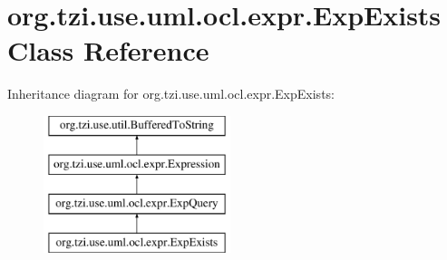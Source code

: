 \hypertarget{classorg_1_1tzi_1_1use_1_1uml_1_1ocl_1_1expr_1_1_exp_exists}{\section{org.\-tzi.\-use.\-uml.\-ocl.\-expr.\-Exp\-Exists Class Reference}
\label{classorg_1_1tzi_1_1use_1_1uml_1_1ocl_1_1expr_1_1_exp_exists}
}
Inheritance diagram for org.\-tzi.\-use.\-uml.\-ocl.\-expr.\-Exp\-Exists\-:\begin{figure}[H]
\begin{center}
\leavevmode
\includegraphics[height=4.000000cm]{classorg_1_1tzi_1_1use_1_1uml_1_1ocl_1_1expr_1_1_exp_exists}
\end{center}
\end{figure}

